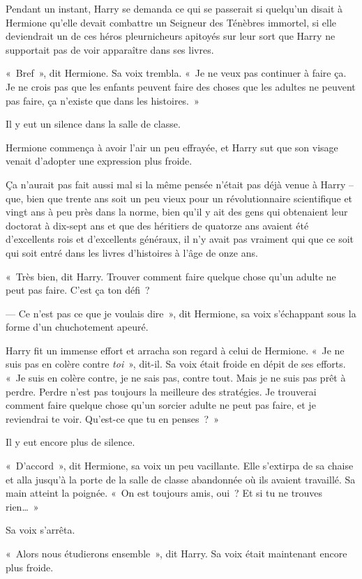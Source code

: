 Pendant un instant, Harry se demanda ce qui se passerait si quelqu'un disait à Hermione qu'elle devait combattre un Seigneur des Ténèbres immortel, si elle deviendrait un de ces héros pleurnicheurs apitoyés sur leur sort que Harry ne supportait pas de voir apparaître dans ses livres.

«~Bref~», dit Hermione. Sa voix trembla. «~Je ne veux pas continuer à faire ça. Je ne crois pas que les enfants peuvent faire des choses que les adultes ne peuvent pas faire, ça n'existe que dans les histoires.~»

Il y eut un silence dans la salle de classe.

Hermione commença à avoir l'air un peu effrayée, et Harry sut que son visage venait d'adopter une expression plus froide.

Ça n'aurait pas fait aussi mal si la même pensée n'était pas déjà venue à Harry -- que, bien que trente ans soit un peu vieux pour un révolutionnaire scientifique et vingt ans à peu près dans la norme, bien qu'il y ait des gens qui obtenaient leur doctorat à dix-sept ans et que des héritiers de quatorze ans avaient été d'excellents rois et d'excellents généraux, il n'y avait pas vraiment qui que ce soit qui soit entré dans les livres d'histoires à l'âge de onze ans.

«~Très bien, dit Harry. Trouver comment faire quelque chose qu'un adulte ne peut pas faire. C'est ça ton défi~?

--- Ce n'est pas ce que je voulais dire~», dit Hermione, sa voix s'échappant sous la forme d'un chuchotement apeuré.

Harry fit un immense effort et arracha son regard à celui de Hermione. «~Je ne suis pas en colère contre \emph{toi}~», dit-il. Sa voix était froide en dépit de ses efforts. «~Je suis en colère contre, je ne sais pas, contre tout. Mais je ne suis pas prêt à perdre. Perdre n'est pas toujours la meilleure des stratégies. Je trouverai comment faire quelque chose qu'un sorcier adulte ne peut pas faire, et je reviendrai te voir. Qu'est-ce que tu en penses~?~»

Il y eut encore plus de silence.

«~D'accord~», dit Hermione, sa voix un peu vacillante. Elle s'extirpa de sa chaise et alla jusqu'à la porte de la salle de classe abandonnée où ils avaient travaillé. Sa main atteint la poignée. «~On est toujours amis, oui~? Et si tu ne trouves rien…~»

Sa voix s'arrêta.

«~Alors nous étudierons ensemble~», dit Harry. Sa voix était maintenant encore plus froide.

